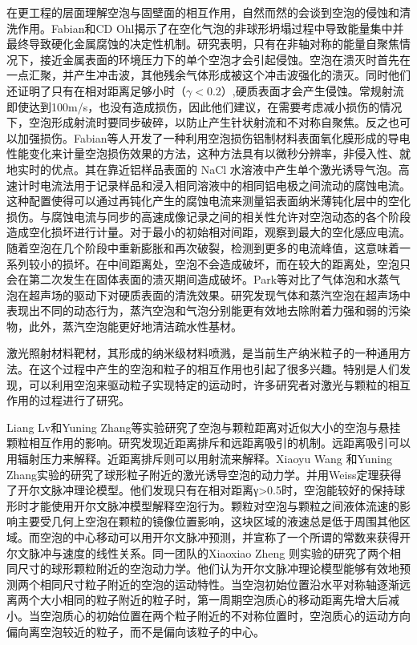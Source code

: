 在更工程的层面理解空泡与固壁面的相互作用，自然而然的会谈到空泡的侵蚀和清洗作用。Fabian和CD Ohl揭示了在空化气泡的非球形坍塌过程中导致能量集中并最终导致硬化金属腐蚀的决定性机制\cite{reuter_cavitation_2022}。研究表明，只有在非轴对称的能量自聚焦情况下，接近金属表面的环境压力下的单个空泡才会引起侵蚀。空泡在溃灭时首先在一点汇聚，并产生冲击波，其他残余气体形成被这个冲击波强化的溃灭。同时他们还证明了只有在相对距离足够小时（$\gamma<0.2$）,硬质表面才会产生侵蚀。常规射流即使达到100m/s，也没有造成损伤，因此他们建议，在需要考虑减小损伤的情况下，空泡形成射流时要同步破碎，以防止产生针状射流和不对称自聚焦。反之也可以加强损伤。Fabian等人开发了一种利用空泡损伤铝制材料表面氧化膜形成的导电性能变化来计量空泡损伤效果的方法，这种方法具有以微秒分辨率，非侵入性、就地实时的优点\cite{abedini_situ_2023}。其在靠近铝样品表面的 NaCl 水溶液中产生单个激光诱导气泡。高速计时电流法用于记录样品和浸入相同溶液中的相同铝电极之间流动的腐蚀电流。这种配置使得可以通过再钝化产生的腐蚀电流来测量铝表面纳米薄钝化层中的空化损伤。与腐蚀电流与同步的高速成像记录之间的相关性允许对空泡动态的各个阶段造成空化损坏进行计量。对于最小的初始相对间距，观察到最大的空化感应电流。随着空泡在几个阶段中重新膨胀和再次破裂，检测到更多的电流峰值，这意味着一系列较小的损坏。在中间距离处，空泡不会造成破坏，而在较大的距离处，空泡只会在第二次发生在固体表面的溃灭期间造成破坏。Park等对比了气体泡和水蒸气泡在超声场的驱动下对硬质表面的清洗效果\cite{park_comparing_2021}。研究发现气体和蒸汽空泡在超声场中表现出不同的动态行为，蒸汽空泡和气泡分别能更有效地去除附着力强和弱的污染物，此外，蒸汽空泡能更好地清洁疏水性基材。

激光照射材料靶材，其形成的纳米级材料喷溅，是当前生产纳米粒子的一种通用方法。在这个过程中产生的空泡和粒子的相互作用也引起了很多兴趣。特别是人们发现，可以利用空泡来驱动粒子实现特定的运动时，许多研究者对激光与颗粒的相互作用的过程进行了研究。

Liang Lv和Yuning Zhang等实验研究了空泡与颗粒距离对近似大小的空泡与悬挂颗粒相互作用的影响\cite{lv_experimental_2019}。研究发现近距离排斥和远距离吸引的机制。远距离吸引可以用辐射压力来解释。近距离排斥则可以用射流来解释。Xiaoyu Wang 和Yuning Zhang实验的研究了球形粒子附近的激光诱导空泡的动力学\cite{wang_theoretical_2022}。并用Weiss定理获得了开尔文脉冲理论模型。他们发现只有在相对距离γ>0.5时，空泡能较好的保持球形时才能使用开尔文脉冲模型解释空泡行为。颗粒对空泡与颗粒之间液体流速的影响主要受几何上空泡在颗粒的镜像位置影响，这块区域的液速总是低于周围其他区域。而空泡的中心移动可以用开尔文脉冲预测，并宣称了一个所谓的常数来获得开尔文脉冲与速度的线性关系。同一团队的Xiaoxiao Zheng 则实验的研究了两个相同尺寸的球形颗粒附近的空泡动力学\cite{zheng_investigation_2023}。他们认为开尔文脉冲理论模型能够有效地预测两个相同尺寸粒子附近的空泡的运动特性。当空泡初始位置沿水平对称轴逐渐远离两个大小相同的粒子附近的粒子时，第一周期空泡质心的移动距离先增大后减小。当空泡质心的初始位置在两个粒子附近的不对称位置时，空泡质心的运动方向偏向离空泡较近的粒子，而不是偏向该粒子的中心。

